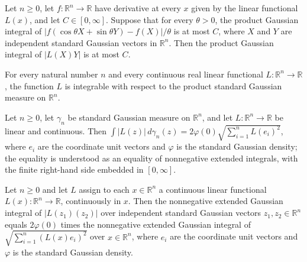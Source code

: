 \begin{lemma}
\leanok
{}
Let $n\ge 0$, let $f:\mathbb R^n\to\mathbb R$ have derivative at every $x$ given by the
linear functional $L(x)$, and let $C\in[0,\infty]$. Suppose that for every $\theta>0$,
the product Gaussian integral of $|f(\cos\theta X+\sin\theta Y)-f(X)|/\theta$ is at most
$C$, where $X$ and $Y$ are independent standard Gaussian vectors in $\mathbb R^n$. Then
the product Gaussian integral of $|L(X)Y|$ is at most $C$.
\end{lemma}

\begin{lemma}
\leanok
{}
For every natural number $n$ and every continuous real linear functional $L:\mathbb
R^n\to\mathbb R$, the function $L$ is integrable with respect to the product standard
Gaussian measure on $\mathbb R^n$.
\end{lemma}

\begin{lemma}
\leanok
{}
Let $n\ge 0$, let $\gamma_n$ be standard Gaussian measure on $\mathbb R^n$, and let
$L:\mathbb R^n\to\mathbb R$ be linear and continuous. Then $\int
|L(z)|\,d\gamma_n(z)=2\varphi(0)\sqrt{\sum_{i=1}^n L(e_i)^2}$, where $e_i$ are the
coordinate unit vectors and $\varphi$ is the standard Gaussian density; the equality is
understood as an equality of nonnegative extended integrals, with the finite right-hand
side embedded in $[0,\infty]$.
\end{lemma}

\begin{lemma}
\leanok
{}
Let $n\ge 0$ and let $L$ assign to each $x\in\mathbb R^n$ a continuous linear functional
$L(x):\mathbb R^n\to\mathbb R$, continuously in $x$. Then the nonnegative extended
Gaussian integral of $|L(z_1)(z_2)|$ over independent standard Gaussian vectors
$z_1,z_2\in\mathbb R^n$ equals $2\varphi(0)$ times the nonnegative extended Gaussian
integral of $\sqrt{\sum_{i=1}^n (L(x)e_i)^2}$ over $x\in\mathbb R^n$, where $e_i$ are
the coordinate unit vectors and $\varphi$ is the standard Gaussian density.
\end{lemma}

